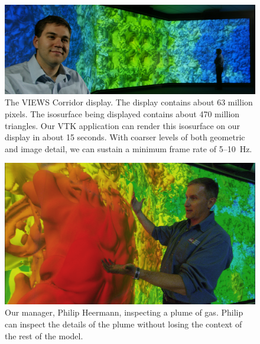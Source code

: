 \documentclass{acmsiggraph}
\newcommand{\sticky}[1]{}
\begin{document}
  
  

  \begin{figure}[!p]
    \includegraphics[width=\textwidth]{images/FullWall}
    \caption{The VIEWS Corridor display.  The display contains about 63
    million pixels.  The isosurface being displayed contains about 470
    million triangles.  Our VTK application can render this isosurface on
    our display in about 15 seconds.  With coarser levels of both geometric
    and image detail, we can sustain a minimum frame rate of 5--10~Hz.
    \sticky{Might want to verify that.}}
    \label{fig:fullwall}
  \end{figure}

  \begin{figure}[!p]
    \includegraphics[width=\textwidth]{images/PhilwBlob}
    \caption{Our manager, Philip Heermann, inspecting a plume of gas.
    Philip can inspect the details of the plume without losing the context
    of the rest of the model.}
    \label{fig:philwblob}
  \end{figure}
\end{document}
